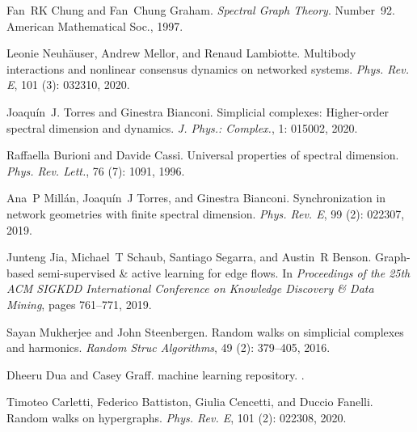 Fan~RK Chung and Fan~Chung Graham.
\newblock \emph{Spectral Graph Theory}.
\newblock Number~92. {American Mathematical Soc.}, 1997.

Leonie Neuh{\"a}user, Andrew Mellor, and Renaud Lambiotte.
\newblock Multibody interactions and nonlinear consensus dynamics on networked
systems.
\newblock \emph{Phys. Rev. E}, 101 (3): 032310, 2020.

Joaqu{\'i}n~J. Torres and Ginestra Bianconi.
\newblock Simplicial complexes: Higher-order spectral dimension and dynamics.
\newblock \emph{J. Phys.: Complex.}, 1: 015002, 2020.

Raffaella Burioni and Davide Cassi.
\newblock Universal properties of spectral dimension.
\newblock \emph{Phys. Rev. Lett.}, 76 (7): 1091, 1996.

Ana~P Mill{\'a}n, Joaqu{\'i}n~J Torres, and Ginestra Bianconi.
\newblock Synchronization in network geometries with finite spectral dimension.
\newblock \emph{Phys. Rev. E}, 99 (2): 022307, 2019.

Junteng Jia, Michael~T Schaub, Santiago Segarra, and Austin~R Benson.
\newblock Graph-based semi-supervised \& active learning for edge flows.
\newblock In \emph{Proceedings of the 25th {{ACM SIGKDD}} International
    Conference on Knowledge Discovery \& Data Mining}, pages 761--771, 2019.

Sayan Mukherjee and John Steenbergen.
\newblock Random walks on simplicial complexes and harmonics.
\newblock \emph{Random Struc Algorithms}, 49 (2): 379--405,
2016.

Dheeru Dua and Casey Graff.
 machine learning repository.
.

Timoteo Carletti, Federico Battiston, Giulia Cencetti, and Duccio Fanelli.
\newblock Random walks on hypergraphs.
\newblock \emph{Phys. Rev. E}, 101 (2): 022308, 2020.

